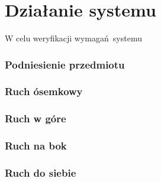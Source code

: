 
\chapter{Działanie systemu\label{chap:weryfikacja_systemu}}

W celu weryfikacji wymagań systemu 

\subsection{Podniesienie przedmiotu}
\subsection{Ruch ósemkowy}
\subsection{Ruch w góre}
\subsection{Ruch na bok}
\subsection{Ruch do siebie}
